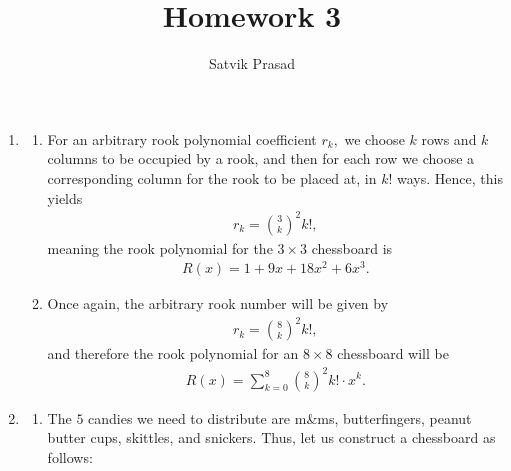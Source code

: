 \documentclass[12pt]{article}
\title{Homework 3}
\author{Satvik Prasad}
\date{}
\begin{document}
\begin{enumerate}
  \item
    \begin{enumerate}
      \item For an arbitrary rook polynomial coefficient $r_k,$ we
        choose $k$ rows and $k$ columns to be occupied by a rook, and
        then for each row we choose a corresponding column for the
        rook to be placed at, in $k!$ ways. Hence, this yields
        \begin{align*}
          r_k = {3 \choose k}^2 k!,
        \end{align*}
        meaning the rook polynomial for the $3 \times 3$ chessboard is
        \begin{align*}
          R(x) = 1 + 9x + 18x^2 + 6x^3.
        \end{align*}

      \item Once again, the arbitrary rook number will be given by
        \begin{align*}
          r_k = {8 \choose k}^2 k!,
        \end{align*}
        and therefore the rook polynomial for an $8\times8$ chessboard will be
        \begin{align*}
          R(x) = \sum_{k=0}^{8}{8 \choose k}^2 k!\cdot x^k.
        \end{align*}
    \end{enumerate}

  \item
    \begin{enumerate}
      \item The $5$ candies we need to distribute are m\&ms,
        butterfingers, peanut butter cups, skittles, and snickers.
        Thus, let us construct a chessboard as follows:


\end{enumerate}
\end{enumerate}
\end{document}
